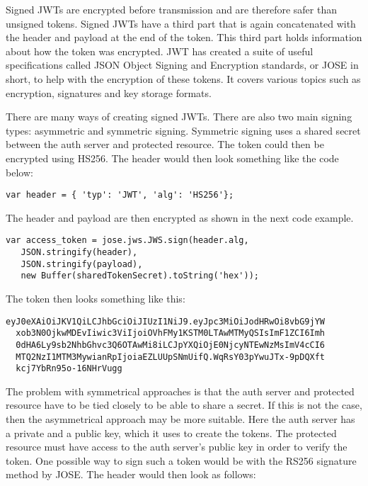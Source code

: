 Signed JWTs are encrypted before transmission and are therefore safer than unsigned tokens. Signed JWTs have a third part that is again concatenated with the header and payload at the end of the token. This third part holds information about how the token was encrypted. JWT has created a suite of useful specifications called JSON Object Signing and Encryption standards, or JOSE in short, to help with the encryption of these tokens. It covers various topics such as encryption, signatures and key storage formats.

There are many ways of creating signed JWTs. There are also two main signing types: asymmetric and symmetric signing. Symmetric signing uses a shared secret between the auth server and protected resource. The token could then be encrypted using HS256. The header would then look something like the code below:

\begin{verbatim}
var header = { 'typ': 'JWT', 'alg': 'HS256'};
\end{verbatim}

The header and payload are then encrypted as shown in the next code example.

\begin{verbatim}
var access_token = jose.jws.JWS.sign(header.alg,
   JSON.stringify(header),
   JSON.stringify(payload),
   new Buffer(sharedTokenSecret).toString('hex'));
\end{verbatim}

The token then looks something like this:

\begin{verbatim}
eyJ0eXAiOiJKV1QiLCJhbGciOiJIUzI1NiJ9.eyJpc3MiOiJodHRwOi8vbG9jYW
  xob3N0OjkwMDEvIiwic3ViIjoiOVhFMy1KSTM0LTAwMTMyQSIsImF1ZCI6Imh
  0dHA6Ly9sb2NhbGhvc3Q6OTAwMi8iLCJpYXQiOjE0NjcyNTEwNzMsImV4cCI6
  MTQ2NzI1MTM3MywianRpIjoiaEZLUUpSNmUifQ.WqRsY03pYwuJTx-9pDQXft
  kcj7YbRn95o-16NHrVugg
\end{verbatim}

The problem with symmetrical approaches is that the auth server and protected resource have to be tied closely to be able to share a secret. If this is not the case, then the asymmetrical approach may be more suitable. Here the auth server has a private and a public key, which it uses to create the tokens. The protected resource must have access to the auth server's public key in order to verify the token. One possible way to sign such a token would be with the RS256 signature method by JOSE. The header would then look as follows:

